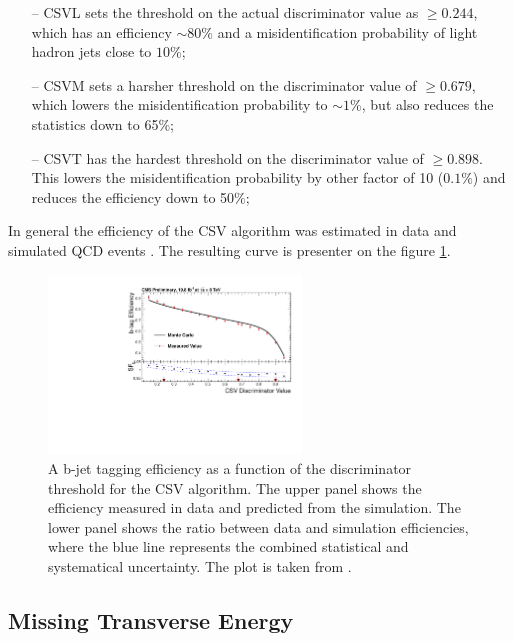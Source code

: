 \begin{itemize}
 \item [--] CSVL sets the threshold on the actual discriminator value as $\geq 0.244$, which has an efficiency $\sim 80\%$ and a misidentification probability of
 light hadron jets close to $10\%$;
 \item [--] CSVM sets a harsher threshold on the discriminator value of $\geq 0.679$, which lowers the misidentification probability to $\sim 1\%$, but also
 reduces the statistics down to 65$\%$;
 \item [--] CSVT has the hardest threshold on the discriminator value of $\geq 0.898$. This lowers the misidentification probability by other factor of 10 ($0.1\%$)
 and reduces the efficiency down to 50$\%$;
\end{itemize}

In general the efficiency of the CSV algorithm was estimated in data and simulated QCD events \cite{CMS-PAS-BTV-13-001}. The resulting curve is presenter on the figure \ref{fig:CSVeff}.

\begin{figure}[t]
  \centering
  \includegraphics[width=0.6\textwidth]{04_event_reconstruction/plots/Figure_012-b.pdf}
  \caption{A b-jet tagging efficiency as a function of the discriminator threshold for the CSV algorithm. The upper panel shows the efficiency measured in data and predicted from the simulation.
  The lower panel shows the ratio between data and simulation efficiencies, where the blue line represents the combined statistical and systematical uncertainty. The plot is taken from \cite{CMS-PAS-BTV-13-001}.}
  \label{fig:CSVeff}
\end{figure}

\subsection{Missing Transverse Energy}

